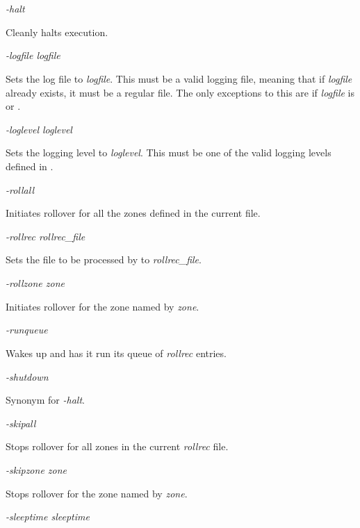 \begin{description}

\item {\it -halt}\verb" "

Cleanly halts  execution.

\item {\it -logfile logfile}\verb" "

Sets the  log file to {\it logfile}.  This must be a valid
logging file, meaning that if {\it logfile} already exists, it must be a
regular file.  The only exceptions to this are if {\it logfile} is
 or .

\item {\it -loglevel loglevel}\verb" "

Sets the  logging level to {\it loglevel}.  This must be one of
the valid logging levels defined in .

\item {\it -rollall}\verb" "

Initiates rollover for all the zones defined in the current 
file.

\item {\it -rollrec rollrec\_file}\verb" "

Sets the  file to be processed by  to
{\it rollrec\_file}.

\item {\it -rollzone zone}\verb" "

Initiates rollover for the zone named by {\it zone}.

\item {\it -runqueue}\verb" "

Wakes up  and has it run its queue of {\it rollrec} entries.

\item {\it -shutdown}\verb" "

Synonym for {\it -halt}.

\item {\it -skipall}\verb" "

Stops rollover for all zones in the current {\it rollrec} file.

\item {\it -skipzone zone}\verb" "

Stops rollover for the zone named by {\it zone}.

\item {\it -sleeptime sleeptime}\verb" "


\end{description}
